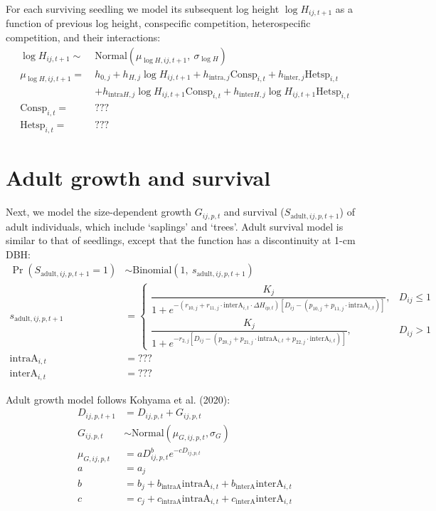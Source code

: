 \documentclass[12pt,a4paper]{article}
\begin{document}
For each surviving seedling we model its subsequent log height $\log H_{ij,t+1}$ as a function of previous log height, conspecific competition, heterospecific competition, and their interactions:
\begin{align}
\log H_{ij,t+1} \sim~& \text{Normal}(\mu_{\log H, ij,t+1},~\sigma_{\log H}) \\
\mu_{\log H, ij,t+1} =~& h_{0,j} + h_{H,j} \log H_{ij,t+1} + h_{\text{intra},j}\text{Consp}_{i,t} + h_{\text{inter},j}\text{Hetsp}_{i,t} \\
& + h_{\text{intra}H,j}\log H_{ij,t+1}\text{Consp}_{i,t} + h_{\text{inter}H,j}\log H_{ij,t+1}\text{Hetsp}_{i,t} \\
\text{Consp}_{i,t} =~& ??? \\
\text{Hetsp}_{i,t} =~& ???
\end{align}

\section{Adult growth and survival}
Next, we model the size-dependent growth $G_{ij,p,t}$ and survival ($S_{\text{adult},ij,p,t+1}$) of adult individuals, which include `saplings' and `trees'. Adult survival model is similar to that of seedlings, except that the function has a discontinuity at 1-cm DBH:
\begin{align}
\Pr(S_{\text{adult},ij,p,t+1} = 1) &\sim \text{Binomial}(1,~s_{\text{adult},ij,p,t+1}) \\
s_{\text{adult},ij,p,t+1} &=
\begin{cases}
    \dfrac{K_j}{1 + e^{-(r_{10,j} + r_{11,j} \cdot \text{interA}_{i,t} \cdot \Delta H_{ip,t}) [D_{ij} - (p_{10,j} + p_{11,j} \cdot \text{intraA}_{i,t}) ]}}, & D_{ij} \leq 1 \\
    \dfrac{K_j}{1 + e^{-r_{2,j}  [D_{ij} -(p_{20,j} + p_{21,j} \cdot \text{intraA}_{i,t} + p_{22,j} \cdot \text{interA}_{i,t})]}},               & D_{ij} > 1
\end{cases} \\
\text{intraA}_{i,t} &= ??? \\
\text{interA}_{i,t} &= ???
\end{align}

Adult growth model follows Kohyama et al. (2020):
\begin{align}
D_{ij,p,t+1} &= D_{ij,p,t} + G_{ij,p,t}\\
G_{ij,p,t} &\sim \text{Normal}(\mu_{G,ij,p,t}, \sigma_{G}) \\
\mu_{G,ij,p,t} &= a D_{ij,p,t}^{b} e^{-c D_{ij,p,t}} \\
a &= a_j \\
b &= b_j + b_\text{intraA} \text{intraA}_{i,t} + b_\text{interA} \text{interA}_{i,t} \\
c &= c_j + c_\text{intraA} \text{intraA}_{i,t} + c_\text{interA} \text{interA}_{i,t}
\end{align}
\end{document}
